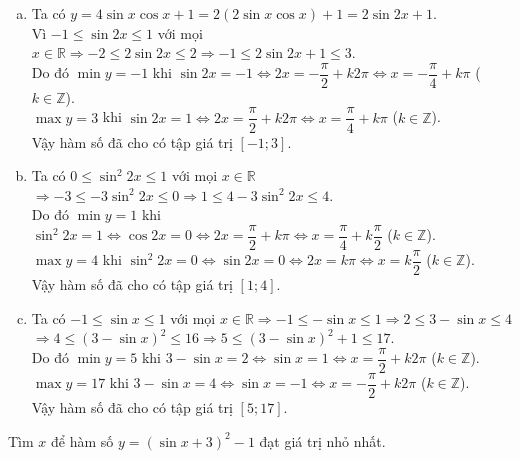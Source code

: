 \begin{vd}
{\begin{enumerate}[a)]
			\item Ta có $y = 4\sin x\cos x + 1 = 2(2\sin x\cos x) + 1 = 2\sin 2x + 1$.\\
			      Vì $-1 \le \sin 2x \le 1$ với mọi $x \in \mathbb{R} \Rightarrow -2 \le 2\sin 2x \le 2 \Rightarrow -1 \le 2\sin 2x + 1 \le 3$.\\
			      Do đó $\min y = -1$ khi $\sin 2x = -1 \Leftrightarrow 2x = -\dfrac{\pi}{2} + k2\pi \Leftrightarrow x = -\dfrac{\pi}{4} + k\pi$ ($k \in \mathbb{Z}$).\\
			      $\max y = 3$ khi $\sin 2x = 1 \Leftrightarrow 2x = \dfrac{\pi}{2} + k2\pi \Leftrightarrow x = \dfrac{\pi}{4} + k\pi$ ($k \in \mathbb{Z}$).\\
			      Vậy hàm số đã cho có tập giá trị $\left[-1;3\right]$.


			\item Ta có $0 \le \sin^2 2x \le 1$ với mọi $x \in \mathbb{R}$\\
			      $\Rightarrow -3 \le -3\sin^2 2x \le 0 \Rightarrow 1 \le 4 - 3\sin^2 2x \le 4$.\\
			      Do đó $\min y = 1$ khi $\sin^2 2x = 1 \Leftrightarrow \cos 2x = 0 \Leftrightarrow 2x = \dfrac{\pi}{2} + k\pi \Leftrightarrow x = \dfrac{\pi}{4} + k\dfrac{\pi}{2}$ ($k \in \mathbb{Z}$).\\
			      $\max y = 4$ khi $\sin^2 2x = 0 \Leftrightarrow \sin 2x = 0 \Leftrightarrow 2x = k\pi \Leftrightarrow x = k\dfrac{\pi}{2}$ ($k \in \mathbb{Z}$).\\
			      Vậy hàm số đã cho có tập giá trị $\left[1;4\right]$.

			\item Ta có $-1 \le \sin x \le 1$ với mọi $x \in \mathbb{R} \Rightarrow -1 \le -\sin x \le 1 \Rightarrow 2 \le 3 - \sin x \le 4$\\
			      $\Rightarrow 4 \le (3 - \sin x)^2 \le 16 \Rightarrow 5 \le (3 - \sin x)^2 + 1 \le 17$.\\
			      Do đó $\min y = 5$ khi $3 - \sin x = 2 \Leftrightarrow \sin x = 1 \Leftrightarrow x = \dfrac{\pi}{2} + k2\pi$ ($k \in \mathbb{Z}$).\\
			      $\max y = 17$ khi $3 - \sin x = 4 \Leftrightarrow \sin x = -1 \Leftrightarrow x = -\dfrac{\pi}{2} + k2\pi$ ($k \in \mathbb{Z}$).\\
			      Vậy hàm số đã cho có tập giá trị $\left[5;17\right]$.
		\end{enumerate}
	}
\end{vd} 
\begin{vd}
	Tìm $x$ để hàm số $y={\left(\sin x+3 \right)^2}-1$ đạt giá trị nhỏ nhất.
\end{vd} 

